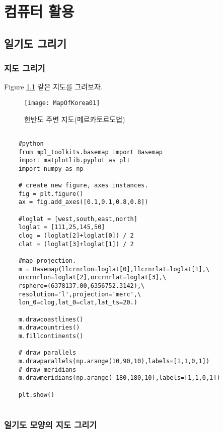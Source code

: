 
\chapter{컴퓨터 활용}

\section{일기도 그리기}

\subsection{지도 그리기}

Figure \ref{fig:mapofkorea01} \과 같은 지도를 그려보자.
\begin{figure}[h]
	\centering
	\texttt{[image: MapOfKorea01]}
	\caption{한반도 주변 지도(메르카토르도법)}
	\label{fig:mapofkorea01}
\end{figure}


\begin{code}
	\begin{lstlisting}
	
	#python 
	from mpl_toolkits.basemap import Basemap
	import matplotlib.pyplot as plt
	import numpy as np
	
	# create new figure, axes instances.
	fig = plt.figure()
	ax = fig.add_axes([0.1,0.1,0.8,0.8])
	
	#loglat = [west,south,east,north]
	loglat = [111,25,145,50]
	clog = (loglat[2]+loglat[0]) / 2
	clat = (loglat[3]+loglat[1]) / 2
	
	#map projection.
	m = Basemap(llcrnrlon=loglat[0],llcrnrlat=loglat[1],\
	urcrnrlon=loglat[2],urcrnrlat=loglat[3],\
	rsphere=(6378137.00,6356752.3142),\
	resolution='l',projection='merc',\
	lon_0=clog,lat_0=clat,lat_ts=20.)
	
	m.drawcoastlines()
	m.drawcountries()
	m.fillcontinents()
	
	# draw parallels
	m.drawparallels(np.arange(10,90,10),labels=[1,1,0,1])
	# draw meridians
	m.drawmeridians(np.arange(-180,180,10),labels=[1,1,0,1])
	
	plt.show()
	
	\end{lstlisting}
\end{code}

\subsection{일기도 모양의 지도 그리기}

